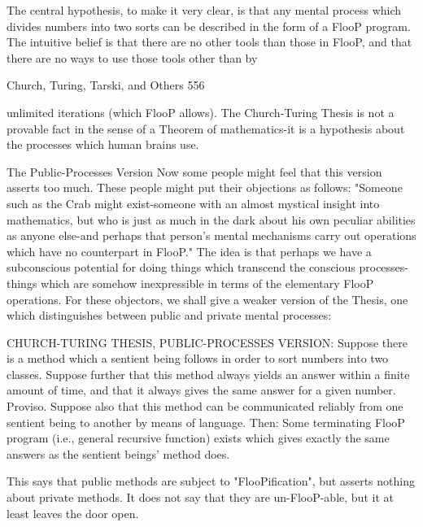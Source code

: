 {The central hypothesis, to make it very clear, is that any mental process which divides
numbers into two sorts can be described in the form of a FlooP program. The intuitive
belief is that there are no other tools than those in FlooP, and that there are no ways to use
those tools other than by




Church, Turing, Tarski, and Others                                                        556

unlimited iterations (which FlooP allows). The Church-Turing Thesis is not a provable
fact in the sense of a Theorem of mathematics-it is a hypothesis about the processes
which human brains use.

                           The Public-Processes Version
Now some people might feel that this version asserts too much. These people might put
their objections as follows: "Someone such as the Crab might exist-someone with an
almost mystical insight into mathematics, but who is just as much in the dark about his
own peculiar abilities as anyone else-and perhaps that person's mental mechanisms carry
out operations which have no counterpart in FlooP." The idea is that perhaps we have a
subconscious potential for doing things which transcend the conscious processes-things
which are somehow inexpressible in terms of the elementary FlooP operations. For these
objectors, we shall give a weaker version of the Thesis, one which distinguishes between
public and private mental processes:

   CHURCH-TURING THESIS, PUBLIC-PROCESSES VERSION: Suppose there
    is a method which a sentient being follows in order to sort numbers into two
    classes. Suppose further that this method always yields an answer within a finite
    amount of time, and that it always gives the same answer for a given number.
    Proviso. Suppose also that this method can be communicated reliably from one
    sentient being to another by means of language. Then: Some terminating FlooP
    program (i.e., general recursive function) exists which gives exactly the same
    answers as the sentient beings' method does.

This says that public methods are subject to "FlooPification", but asserts nothing about
private methods. It does not say that they are un-FlooP-able, but it at least leaves the door
open.

}
